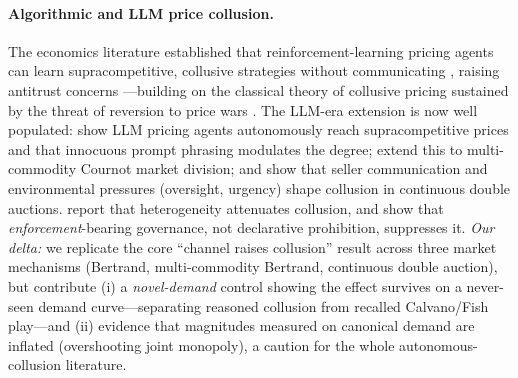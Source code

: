 \paragraph{Algorithmic and LLM price collusion.}
The economics literature established that reinforcement-learning pricing agents can learn
supracompetitive, collusive strategies without communicating \citep{calvano2020ai}, raising
antitrust concerns \citep{ezrachi2017collusion}---building on the classical theory of
collusive pricing sustained by the threat of reversion to price wars
\citep{rotemberg1986pricewars}. The LLM-era extension is now well populated:
\citet{fish2024algorithmic} show LLM pricing agents autonomously reach supracompetitive
prices and that innocuous prompt phrasing modulates the degree; \citet{lin2024strategic}
extend this to multi-commodity Cournot market division; and \citet{agrawal2025double} show
that seller communication and environmental pressures (oversight, urgency) shape collusion in
continuous double auctions. \citet{keppo2026fragility} report that heterogeneity attenuates
collusion, and \citet{bracale2026institutional} show that \emph{enforcement}-bearing
governance, not declarative prohibition, suppresses it. \emph{Our delta:} we replicate the
core ``channel raises collusion'' result across three market mechanisms (Bertrand,
multi-commodity Bertrand, continuous double auction), but contribute (i) a \emph{novel-demand}
control showing the effect survives on a never-seen demand curve---separating reasoned
collusion from recalled Calvano/Fish play---and (ii) evidence that magnitudes measured on
canonical demand are inflated (overshooting joint monopoly), a caution for the whole
autonomous-collusion literature.

